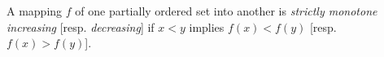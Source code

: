 A mapping $f$ of one partially ordered set into another is \textit{strictly monotone increasing} [resp. \textit{decreasing}] if $x < y$ implies $f(x) < f(y)$ [resp. $f(x) > f(y)$].
